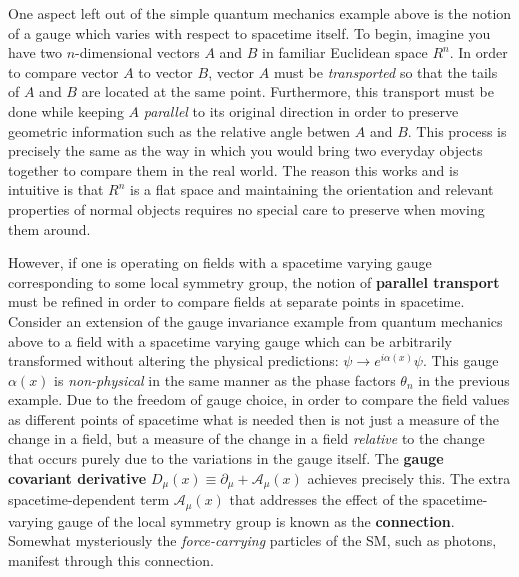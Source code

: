 One aspect left out of the simple quantum mechanics example above is the notion of a gauge which varies with respect to spacetime itself.
To begin, imagine you have two $n$-dimensional vectors $A$ and $B$ in familiar Euclidean space $R^n$. In order to compare vector $A$ to vector $B$, vector $A$ must be \textit{transported} so that the tails of $A$ and $B$ are located at the same point.
Furthermore, this transport must be done while keeping $A$ \textit{parallel} to its original direction in order to preserve geometric information such as the relative angle betwen $A$ and $B$.
This process is precisely the same as the way in which you would bring two everyday objects together to compare them in the real world.
The reason this works and is intuitive is that $R^n$ is a flat space and maintaining the orientation and relevant properties of normal objects requires no special care to preserve when moving them around.

\newcommand{\conn}{ \ensuremath{ \boldsymbol{\mathcal{A}} } }
However, if one is operating on fields with a spacetime varying gauge corresponding to some local symmetry group, the notion of \textbf{parallel transport} must be refined in order to compare fields at separate points in spacetime.
Consider an extension of the gauge invariance example from quantum mechanics above to a field with a spacetime varying gauge which can be arbitrarily transformed without altering the physical predictions: $\psi \rightarrow e^{i\alpha(x)} \psi$.
This gauge $\alpha(x)$ is \textit{non-physical} in the same manner as the phase factors $\theta_n$ in the previous example.
Due to the freedom of gauge choice, in order to compare the field values as different points of spacetime what is needed then is not just a measure of the change in a field, but a measure of the change in a field \textit{relative} to the change that occurs purely due to the variations in the gauge itself.
The \textbf{gauge covariant derivative} $D_\mu(x) \equiv \partial_\mu + \conn_\mu(x)$ achieves precisely this.
The extra spacetime-dependent term $\conn_\mu(x)$ that addresses the effect of the spacetime-varying gauge of the local symmetry group is known as the \textbf{connection}.
Somewhat mysteriously the \textit{force-carrying} particles of the SM, such as photons, manifest through this connection.

